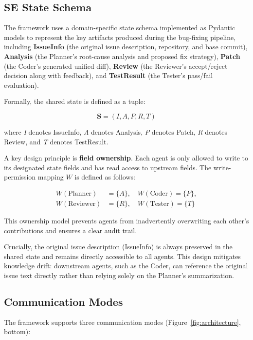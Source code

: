 \documentclass{ieeeaccess}
\begin{document}
\subsection{SE State Schema}

The framework uses a domain-specific state schema implemented as Pydantic models to represent the key artifacts produced during the bug-fixing pipeline, including \textbf{IssueInfo} (the original issue description, repository, and base commit), \textbf{Analysis} (the Planner's root-cause analysis and proposed fix strategy), \textbf{Patch} (the Coder's generated unified diff), \textbf{Review} (the Reviewer's accept/reject decision along with feedback), and \textbf{TestResult} (the Tester's pass/fail evaluation).

Formally, the shared state is defined as a tuple:

\[\mathbf{S} = (I, A, P, R, T)\]

where \emph{I} denotes IssueInfo, \emph{A} denotes Analysis, \emph{P} denotes Patch, \emph{R} denotes Review, and \emph{T} denotes TestResult.

A key design principle is \textbf{field ownership}. Each agent is only allowed to write to its designated state fields and has read access to upstream fields. The write-permission mapping $W$ is defined as follows:

\begin{align*}
W(\text{Planner}) &= \{A\}, \quad W(\text{Coder}) = \{P\}, \\
W(\text{Reviewer}) &= \{R\}, \quad W(\text{Tester}) = \{T\}
\end{align*}

This ownership model prevents agents from inadvertently overwriting each other's contributions and ensures a clear audit trail.

Crucially, the original issue description (IssueInfo) is always preserved in the shared state and remains directly accessible to all agents. This design mitigates knowledge drift: downstream agents, such as the Coder, can reference the original issue text directly rather than relying solely on the Planner's summarization.

\subsection{Communication Modes}
\label{sec:comm-modes}

The framework supports three communication modes (Figure~\ref{fig:architecture}, bottom):
\end{document}
